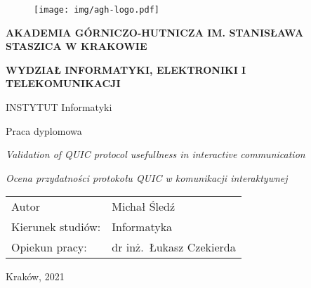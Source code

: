 \thispagestyle{empty}
{\selectfont
\begin{figure}[htbp]
    \centering
    \texttt{[image: img/agh-logo.pdf]}
    \label{fig:figure}
\end{figure}
\centerline{\scriptsize\textbf{AKADEMIA GÓRNICZO-HUTNICZA IM. STANISŁAWA STASZICA W KRAKOWIE}}
\centerline{\scriptsize\textbf{WYDZIAŁ INFORMATYKI, ELEKTRONIKI I TELEKOMUNIKACJI}}
\centerline{\scriptsize INSTYTUT Informatyki}
\vspace{2em}
\centerline{\large Praca dyplomowa}
\vspace{2em}
\centerline{\textit{\large Validation of QUIC protocol usefullness in interactive communication}}
\vspace{1em}
\centerline{\textit{\large Ocena przydatności protokołu QUIC w komunikacji interaktywnej}}
\vspace{3em}

\begin{table}[h]
    \begin{tabular}{l l}
        \large  Autor             & \large Michał Śledź              \\
        \large  Kierunek studiów: & \large Informatyka               \\
        \large  Opiekun pracy:    & \large dr inż.\ Łukasz Czekierda \\
    \end{tabular}
    \label{tab:table}
\end{table}

\null
\vfill
\centerline{Kraków, 2021}
}